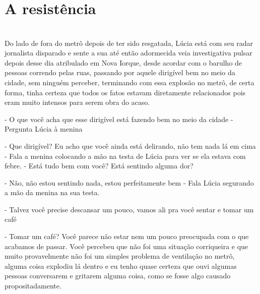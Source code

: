
    
    

\newpage


\ifdefined\useChapters
\chapter{A resistência}

\else
\chapter{}
\fi


Do lado de fora do metrô depois de ter sido resgatada, Lúcia está com seu radar jornalista disparado e sente a sua até então adormecida veia investigativa pulsar depois desse dia atribulado em Nova Iorque, desde acordar com o barulho de pessoas correndo pelas ruas, passando por aquele dirigível bem no meio da cidade, sem ninguém perceber, terminando com essa explosão no metrô, de certa forma, tinha certeza que todos os fatos estavam diretamente relacionados pois eram muito intensos para serem obra do acaso.

- O que você acha que esse dirigível está fazendo bem no meio da cidade - Pergunta Lúcia à menina

- Que dirigível? Eu acho que você ainda está delirando, não tem nada lá em cima - Fala a menina colocando a mão na testa de Lúcia para ver se ela estava com febre. - Está tudo bem com você? Está sentindo alguma dor?

- Não, não estou sentindo nada, estou perfeitamente bem - Fala Lúcia segurando a mão da menina na sua testa.

- Talvez você precise descansar um pouco, vamos ali  pra você sentar e tomar um café

- Tomar um café? Você parece não estar nem um pouco preocupada com o que acabamos de passar. Você percebeu que não foi uma situação corriqueira e que muito provavelmente não foi um simples problema de ventilação no metrô, alguma coisa explodiu lá dentro e eu tenho quase certeza que ouvi algumas pessoas conversarem e gritarem alguma coisa, como se fosse algo causado propositadamente.

